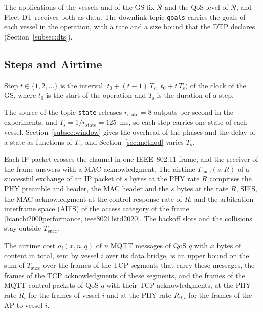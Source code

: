 The applications of the vessels and of the GS fix $\mathcal{R}$ and the QoS level of $\mathcal{R}$, and Fleet-DT receives both as data. The downlink topic \texttt{goals} carries the goals of each vessel in the operation, with a rate and a size bound that the DTP declares (Section~\ref{subsec:dts}).

\subsection{Steps and Airtime}\label{subsec:steps}

\begin{definition}[Step]\label{def:step}
Step $t \in \{1, 2, \dots\}$ is the interval $[t_0 + (t-1)\,T_{\mathrm{s}},\ t_0 + t\,T_{\mathrm{s}})$ of the clock of the GS, where $t_0$ is the start of the operation and $T_{\mathrm{s}}$ is the duration of a step.
\end{definition}

The source of the topic \texttt{state} releases $r_{\mathrm{state}} = 8$ outputs per second in the experiments, and $T_{\mathrm{s}} = 1/r_{\mathrm{state}} = 125$~ms, so each step carries one state of each vessel. Section~\ref{subsec:window} gives the overhead of the phases and the delay of a state as functions of $T_{\mathrm{s}}$, and Section~\ref{sec:method} varies $T_{\mathrm{s}}$.

Each IP packet crosses the channel in one IEEE~802.11 frame, and the receiver of the frame answers with a MAC acknowledgment. The airtime $T_{\mathrm{succ}}(s, R)$ of a successful exchange of an IP packet of $s$ bytes at the PHY rate $R$ comprises the PHY preamble and header, the MAC header and the $s$ bytes at the rate $R$, SIFS, the MAC acknowledgment at the control response rate of $R$, and the arbitration interframe space (AIFS) of the access category of the frame [bianchi2000performance, ieee80211std2020]. The backoff slots and the collisions stay outside $T_{\mathrm{succ}}$.

\begin{definition}\label{def:cost}
The airtime cost $a_i(x, n, q)$ of $n$ MQTT messages of QoS $q$ with $x$ bytes of content in total, sent by vessel $i$ over its data bridge, is an upper bound on the sum of $T_{\mathrm{succ}}$ over the frames of the TCP segments that carry these messages, the frames of the TCP acknowledgments of these segments, and the frames of the MQTT control packets of QoS $q$ with their TCP acknowledgments, at the PHY rate $R_i$ for the frames of vessel $i$ and at the PHY rate $R_{0,i}$ for the frames of the AP to vessel $i$.
\end{definition}

